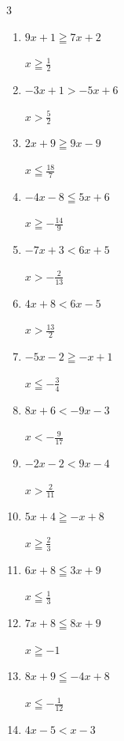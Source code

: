 \begin{multicols}{3}
\begin{enumerate}
        $\displaystyle x\geqq -\frac{3}{7}$

  \item $9x+1\geqq 7x+2$

        $\displaystyle x\geqq \frac{1}{2}$

  \item $-3x+1>-5x+6$

        $\displaystyle x>\frac{5}{2}$

  \item $2x+9\geqq 9x-9$

        $\displaystyle x\leqq \frac{18}{7}$

  \item $-4x-8\leqq 5x+6$

        $\displaystyle x\geqq -\frac{14}{9}$

  \item $-7x+3<6x+5$

        $\displaystyle x>-\frac{2}{13}$

  \item $4x+8<6x-5$

        $\displaystyle x>\frac{13}{2}$

  \item $-5x-2\geqq -x+1$

        $\displaystyle x\leqq -\frac{3}{4}$

  \item $8x+6<-9x-3$

        $\displaystyle x<-\frac{9}{17}$

\columnbreak %

  \item $-2x-2<9x-4$

        $\displaystyle x>\frac{2}{11}$

  \item $5x+4\geqq -x+8$

        $\displaystyle x\geqq \frac{2}{3}$

  \item $6x+8\leqq 3x+9$

        $\displaystyle x\leqq \frac{1}{3}$

  \item $7x+8\leqq 8x+9$

        $\displaystyle x\geqq -1$

  \item $8x+9\leqq -4x+8$

        $\displaystyle x\leqq -\frac{1}{12}$

  \item $4x-5<x-3$


\end{enumerate}
\end{multicols}

